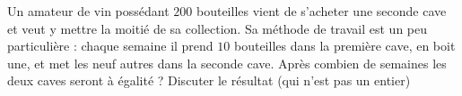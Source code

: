 
\begin{exercice}\label{exosmath-0495}

    Un amateur de vin possédant \( 200\) bouteilles vient de s'acheter une seconde cave et veut y mettre la moitié de sa collection. Sa méthode de travail est un peu particulière : chaque semaine il prend \( 10\) bouteilles dans la première cave, en boit une, et met les neuf autres dans la seconde cave. Après combien de semaines les deux caves seront à égalité ? Discuter le résultat (qui n'est pas un entier)

\end{exercice}
